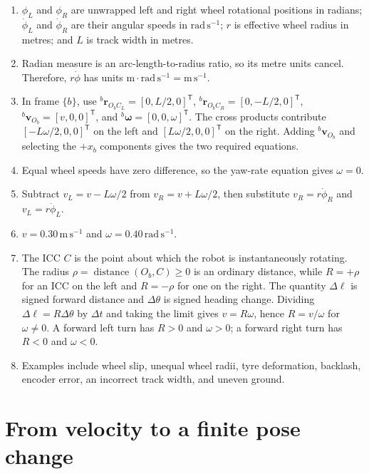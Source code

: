 \documentclass[
  australian,
  12pt,
  letterpaper,
  DIV=11,
  numbers=noendperiod,
  twoside]{scrreprt}
\providecommand{\tightlist}{%
  \setlength{\itemsep}{0pt}\setlength{\parskip}{0pt}}
\begin{document}
\begin{enumerate}
\def\labelenumi{\arabic{enumi}.}
\tightlist
\item
  \(\phi_L\) and \(\phi_R\) are unwrapped left and right wheel
  rotational positions in radians; \(\dot\phi_L\) and \(\dot\phi_R\) are
  their angular speeds in \(\mathrm{rad\,s^{-1}}\); \(r\) is effective
  wheel radius in metres; and \(L\) is track width in metres.
\item
  Radian measure is an arc-length-to-radius ratio, so its metre units
  cancel. Therefore, \(r\dot\phi\) has units
  \(\mathrm m\cdot\mathrm{rad\,s^{-1}}=\mathrm{m\,s^{-1}}\).
\item
  In frame \(\{b\}\), use
  \({}^{b}\mathbf r_{O_bC_L}=[0,L/2,0]^\mathsf T\),
  \({}^{b}\mathbf r_{O_bC_R}=[0,-L/2,0]^\mathsf T\),
  \({}^{b}\mathbf v_{O_b}=[v,0,0]^\mathsf T\), and
  \({}^{b}\boldsymbol{\omega}=[0,0,\omega]^\mathsf T\). The cross
  products contribute \([-L\omega/2,0,0]^\mathsf T\) on the left and
  \([L\omega/2,0,0]^\mathsf T\) on the right. Adding
  \({}^{b}\mathbf v_{O_b}\) and selecting the \(+x_b\) components gives
  the two required equations.
\item
  Equal wheel speeds have zero difference, so the yaw-rate equation
  gives \(\omega=0\).
\item
  Subtract \(v_L=v-L\omega/2\) from \(v_R=v+L\omega/2\), then substitute
  \(v_R=r\dot\phi_R\) and \(v_L=r\dot\phi_L\).
\item
  \(v=0.30\,\mathrm{m\,s^{-1}}\) and
  \(\omega=0.40\,\mathrm{rad\,s^{-1}}\).
\item
  The ICC \(C\) is the point about which the robot is instantaneously
  rotating. The radius \(\rho=\operatorname{distance}(O_b,C)\geq0\) is
  an ordinary distance, while \(R=+\rho\) for an ICC on the left and
  \(R=-\rho\) for one on the right. The quantity \(\Delta\ell\) is
  signed forward distance and \(\Delta\theta\) is signed heading change.
  Dividing \(\Delta\ell=R\Delta\theta\) by \(\Delta t\) and taking the
  limit gives \(v=R\omega\), hence \(R=v/\omega\) for \(\omega\neq0\). A
  forward left turn has \(R>0\) and \(\omega>0\); a forward right turn
  has \(R<0\) and \(\omega<0\).
\item
  Examples include wheel slip, unequal wheel radii, tyre deformation,
  backlash, encoder error, an incorrect track width, and uneven ground.
\end{enumerate}

\section{From velocity to a finite pose
change}\label{from-velocity-to-a-finite-pose-change}
\end{document}
